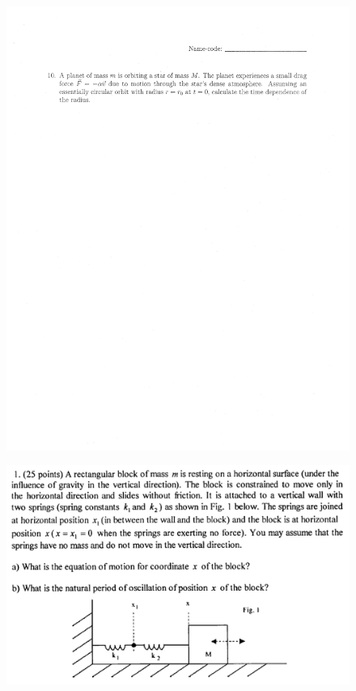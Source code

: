 \documentclass[10pt,a4paper]{article}
\begin{document}
\begin{figure}[H]
 \centering
 \includegraphics[width=16cm]{pdf/1-1T61.png}
\end{figure}
 \newpage
\begin{figure}[H]
 \centering
 \includegraphics[width=16cm]{pdf/1-1T6.png}
\end{figure}
\end{document}
